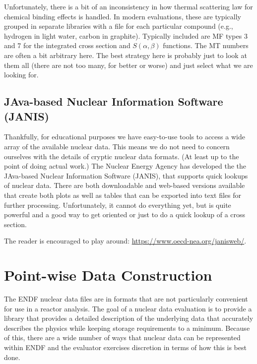 Unfortunately, there is a bit of an inconsistency in how thermal scattering law for chemical binding effects is handled. In modern evaluations, these are typically grouped in separate libraries with a file for each particular compound (e.g., hydrogen in light water, carbon in graphite). Typically included are MF types 3 and 7 for the integrated cross section and $S(\alpha,\beta)$ functions. The MT numbers are often a bit arbitrary here. The best strategy here is probably just to look at them all (there are not too many, for better or worse) and just select what we are looking for.

\subsection{JAva-based Nuclear Information Software (JANIS)}

Thankfully, for educational purposes we have easy-to-use tools to access a wide array of the available nuclear data. This means we do not need to concern ourselves with the details of cryptic nuclear data formats. (At least up to the point of doing actual work.) The Nuclear Energy Agency has developed the the JAva-based Nuclear Information Software (JANIS), that supports quick lookups of nuclear data. There are both downloadable and web-based versions available that create both plots as well as tables that can be exported into text files for further processing. Unfortunately, it cannot do everything yet, but is quite powerful and a good way to get oriented or just to do a quick lookup of a cross section. 

The reader is encouraged to play around: \url{https://www.oecd-nea.org/janisweb/}.





\section{Point-wise Data Construction}

The ENDF nuclear data files are in formats that are not particularly convenient for use in a reactor analysis. The goal of a nuclear data evaluation is to provide a library that provides a detailed description of the underlying data that accurately describes the physics while keeping storage requirements to a minimum. Because of this, there are a wide number of ways that nuclear data can be represented within ENDF and the evaluator exercises discretion in terms of how this is best done. 

